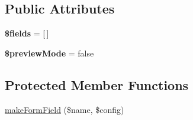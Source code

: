 \subsection*{Public Attributes}
\begin{DoxyCompactItemize}
\item 
\hypertarget{classDMA_1_1Friends_1_1Classes_1_1ActivityForm_ab9f1445590940a3564581d3481b942c5}{}{\bfseries \$fields} = \mbox{[}$\,$\mbox{]}\label{classDMA_1_1Friends_1_1Classes_1_1ActivityForm_ab9f1445590940a3564581d3481b942c5}

\item 
\hypertarget{classDMA_1_1Friends_1_1Classes_1_1ActivityForm_ac7ba33a73e3e8269a24e2b1b37b8778a}{}{\bfseries \$preview\+Mode} = false\label{classDMA_1_1Friends_1_1Classes_1_1ActivityForm_ac7ba33a73e3e8269a24e2b1b37b8778a}

\end{DoxyCompactItemize}
\subsection*{Protected Member Functions}
\begin{DoxyCompactItemize}
\item 
\hyperlink{classDMA_1_1Friends_1_1Classes_1_1ActivityForm_a8e64eb3aac3a88edbbc67700f40f7f61}{make\+Form\+Field} (\$name, \$config)
\end{DoxyCompactItemize}
